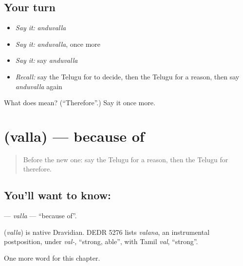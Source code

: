 \subsection*{Your turn}
\begin{itemize}
\raggedright
  \item \emph{Say it:} \emph{anduvalla}
  \item \emph{Say it:} \emph{anduvalla}, once more
  \item \emph{Say it:} say \emph{anduvalla}
  \item \emph{Recall:} say the Telugu for to decide, then the Telugu for a reason, then say \emph{anduvalla} again
\end{itemize}

\begin{tcolorbox}[breakable,colback=teal!4,colframe=teal!35!black,title={Before you move on}]
What does  mean? (\textquotedblleft{}Therefore\textquotedblright{}.) Say it once more.
\end{tcolorbox}
\section[\texorpdfstring{\te{వల్ల} (valla)}{వల్ల (valla)}]{ (valla) — because of}

\label{lesson:TE-C108-valla}



\begin{quote}
Before the new one: say the Telugu for a reason, then the Telugu for therefore.
\end{quote}

\subsection*{You'll want to know: }
\textbf{} — \emph{valla} — \textquotedblleft{}because of\textquotedblright{}.

\begin{cousinweb}
\textbf{} (\emph{valla}) is native Dravidian. DEDR 5276 lists \emph{valana}, an instrumental postposition, under \emph{val-}, \textquotedblleft{}strong, able\textquotedblright{}, with Tamil \emph{val}, \textquotedblleft{}strong\textquotedblright{}.
\end{cousinweb}

\begin{grammarlens}[title={What you've built}]
One more word for this chapter.
\end{grammarlens}

